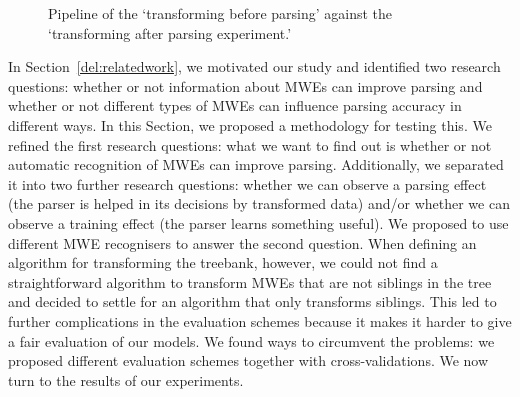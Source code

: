 \documentclass[output=paper]{langsci/langscibook}
\begin{document}
    \begin{figure}[h]
        \small
        \caption{Pipeline of the `transforming before parsing' against the `transforming after parsing experiment.' \label{del:fig:pipel2}}
    \end{figure}

    \indent In Section~\ref{del:relatedwork}, we motivated our study and identified two research questions: whether or not information about MWEs can improve  parsing and whether or not different types of MWEs can influence parsing accuracy in different ways. In this Section, we proposed a methodology for testing this. We refined the first research questions: what we want to find out is whether or not automatic recognition of MWEs can improve  parsing. Additionally, we separated it into two further research questions: whether we can observe a parsing effect (the parser is helped in its decisions by transformed data) and/or whether we can observe a training effect (the parser learns something useful). We proposed to use different MWE recognisers to answer the second question. When defining an algorithm for transforming the treebank, however, we could not find a straightforward algorithm to transform MWEs that are not siblings in the tree and decided to settle for an algorithm that only transforms siblings. This led to further complications in the evaluation schemes because it makes it harder to give a fair evaluation of our models. We found ways to circumvent the problems: we proposed different evaluation schemes together with cross-validations. We now turn to the results of our experiments.
\end{document}
